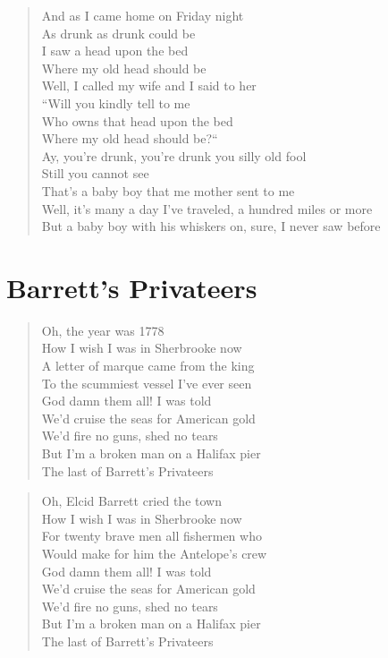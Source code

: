 \documentclass[8pt,twoside]{extarticle}
\newenvironment{xverse}{
	\interlinepenalty 10000
	\begin{verse}
	\begin{minipage}{\linewidth}
	\parskip 5pt
	\vspace{-6pt}
	}
	{
	\end{minipage}
	\end{verse}
	\penalty 0
	\vspace{-6pt}
	}
\begin{document}
\begin{xverse}
And as I came home on Friday night \\
As drunk as drunk could be \\
I saw a head upon the bed \\
Where my old head should be \\
Well, I called my wife and I said to her \\
“Will you kindly tell to me \\
Who owns that head upon the bed \\
Where my old head should be?“ \\
Ay, you’re drunk, you’re drunk you silly old fool \\
Still you cannot see \\
That’s a baby boy that me mother sent to me \\
Well, it’s many a day I’ve traveled, a hundred miles or more \\
But a baby boy with his whiskers on, sure, I never saw before \\
\end{xverse}

\section{Barrett’s Privateers}

\begin{xverse}
Oh, the year was 1778 \\
How I wish I was in Sherbrooke now \\
A letter of marque came from the king \\
To the scummiest vessel I’ve ever seen \\
God damn them all! I was told \\
We’d cruise the seas for American gold \\
We’d fire no guns, shed no tears \\
But I’m a broken man on a Halifax pier \\
The last of Barrett’s Privateers \\
\end{xverse}

\begin{xverse}
Oh, Elcid Barrett cried the town \\
How I wish I was in Sherbrooke now \\
For twenty brave men all fishermen who \\
Would make for him the Antelope’s crew \\
God damn them all! I was told \\
We’d cruise the seas for American gold \\
We’d fire no guns, shed no tears \\
But I’m a broken man on a Halifax pier \\
The last of Barrett’s Privateers \\
\end{xverse}
\end{document}
